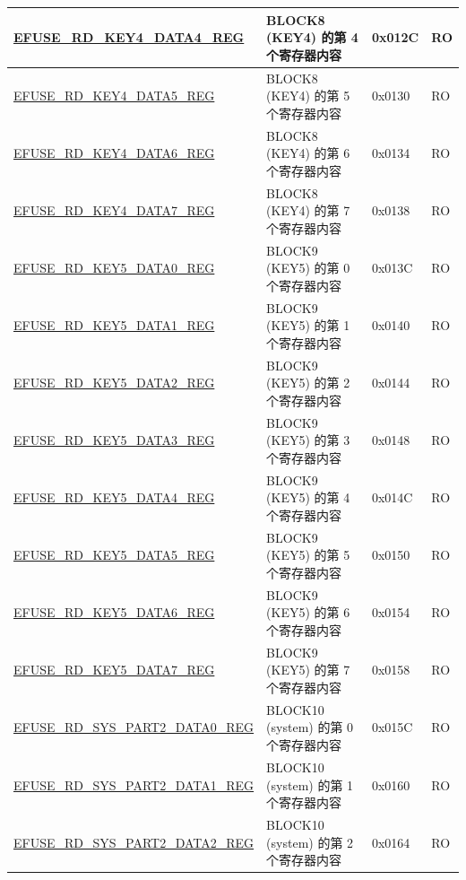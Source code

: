 \begin{longtable}{ | p{6.8cm} | p{7cm} | p{1.3cm} | p{1.2cm} | }
    \hyperref[regdesc:EFUSERDKEY4DATANREG]{EFUSE\_RD\_KEY4\_DATA4\_REG} & BLOCK8 (KEY4) 的第 4 个寄存器内容 & 0x012C & RO \\ \hline
    \hyperref[regdesc:EFUSERDKEY4DATANREG]{EFUSE\_RD\_KEY4\_DATA5\_REG} & BLOCK8 (KEY4) 的第 5 个寄存器内容 & 0x0130 & RO \\ \hline
    \hyperref[regdesc:EFUSERDKEY4DATANREG]{EFUSE\_RD\_KEY4\_DATA6\_REG} & BLOCK8 (KEY4) 的第 6 个寄存器内容 & 0x0134 & RO \\ \hline
    \hyperref[regdesc:EFUSERDKEY4DATANREG]{EFUSE\_RD\_KEY4\_DATA7\_REG} & BLOCK8 (KEY4) 的第 7 个寄存器内容 & 0x0138 & RO \\ \hline
    \hyperref[regdesc:EFUSERDKEY5DATANREG]{EFUSE\_RD\_KEY5\_DATA0\_REG} & BLOCK9 (KEY5) 的第 0 个寄存器内容 & 0x013C & RO \\ \hline
    \hyperref[regdesc:EFUSERDKEY5DATANREG]{EFUSE\_RD\_KEY5\_DATA1\_REG} & BLOCK9 (KEY5) 的第 1 个寄存器内容 & 0x0140 & RO \\ \hline
    \hyperref[regdesc:EFUSERDKEY5DATANREG]{EFUSE\_RD\_KEY5\_DATA2\_REG} & BLOCK9 (KEY5) 的第 2 个寄存器内容 & 0x0144 & RO \\ \hline
    \hyperref[regdesc:EFUSERDKEY5DATANREG]{EFUSE\_RD\_KEY5\_DATA3\_REG} & BLOCK9 (KEY5) 的第 3 个寄存器内容 & 0x0148 & RO \\ \hline
    \hyperref[regdesc:EFUSERDKEY5DATANREG]{EFUSE\_RD\_KEY5\_DATA4\_REG} & BLOCK9 (KEY5) 的第 4 个寄存器内容 & 0x014C & RO \\ \hline
    \hyperref[regdesc:EFUSERDKEY5DATANREG]{EFUSE\_RD\_KEY5\_DATA5\_REG} & BLOCK9 (KEY5) 的第 5 个寄存器内容 & 0x0150 & RO \\ \hline
    \hyperref[regdesc:EFUSERDKEY5DATANREG]{EFUSE\_RD\_KEY5\_DATA6\_REG} & BLOCK9 (KEY5) 的第 6 个寄存器内容 & 0x0154 & RO \\ \hline
    \hyperref[regdesc:EFUSERDKEY5DATANREG]{EFUSE\_RD\_KEY5\_DATA7\_REG} & BLOCK9 (KEY5) 的第 7 个寄存器内容 & 0x0158 & RO \\ \hline
    \hyperref[regdesc:EFUSERDSYSPART2DATANREG]{EFUSE\_RD\_SYS\_PART2\_DATA0\_REG} & BLOCK10 (system) 的第 0 个寄存器内容 & 0x015C & RO \\ \hline
    \hyperref[regdesc:EFUSERDSYSPART2DATANREG]{EFUSE\_RD\_SYS\_PART2\_DATA1\_REG} & BLOCK10 (system) 的第 1 个寄存器内容 & 0x0160 & RO \\ \hline
    \hyperref[regdesc:EFUSERDSYSPART2DATANREG]{EFUSE\_RD\_SYS\_PART2\_DATA2\_REG} & BLOCK10 (system) 的第 2 个寄存器内容 & 0x0164 & RO \\ \hline

\end{longtable}
